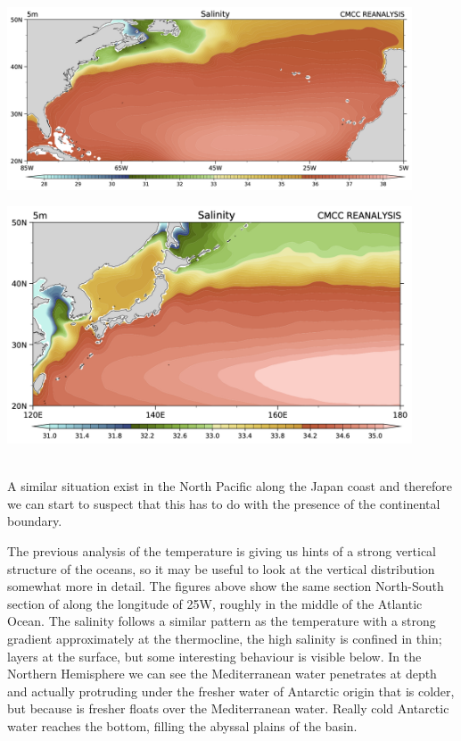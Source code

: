 \begin{minipage}{0.45\textwidth}\label{fig:fig4}
    \includegraphics[width=0.9\textwidth]{uploads/29image.png}
\end{minipage}
\begin{minipage}{0.4\textwidth}
    \includegraphics[width=0.9\textwidth]{uploads/30image.png}
\end{minipage}\\


A similar situation exist in the North Pacific along the Japan coast and
therefore we can start to suspect that this has to do with the presence
of the continental boundary.

The previous analysis of the temperature is giving us hints of a strong
vertical structure of the oceans, so it may be useful to look at the
vertical distribution somewhat more in detail. The figures above show the same section North-South section of along the longitude of 25W, roughly in the middle of the Atlantic Ocean.
The salinity follows a similar pattern as the temperature with a
strong gradient approximately at the thermocline, the high salinity is
confined in thin; layers at the surface, but some interesting behaviour
is visible below. In the Northern Hemisphere we can see the
Mediterranean water penetrates at depth and actually protruding under the fresher water of Antarctic origin that is colder, but because is
fresher floats over the Mediterranean water. Really cold Antarctic water reaches the bottom, filling the abyssal plains of the basin.

